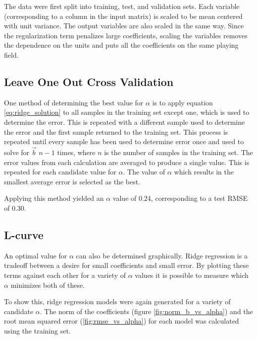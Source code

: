 \documentclass{IEEEtran}
\begin{document}
The data were first split into training, test, and validation sets. Each variable (corresponding to a 
column in the input matrix) is scaled to be mean centered with unit variance. The output variables are 
also scaled in the same way. Since the regularization term penalizes large coefficients, scaling the 
variables removes the dependence on the units and puts all the coefficients on the same playing field.

\subsection{Leave One Out Cross Validation}
One method of determining the best value for $\alpha$ is to apply equation \ref{eq:ridge_solution} to 
all samples in the training set except one, which is used to determine the error. This is repeated with a 
different sample used to determine the error and the first sample returned to the training set. This process
is repeated until every sample has been used to determine error once and used to solve for $\vec{b}$ $n-1$ 
times, where $n$ is the number of samples in the training set. The error values from each calculation are 
averaged to produce a single value. This is repeated for each candidate value for $\alpha$. The value of
$\alpha$ which results in the smallest average error is selected as the best.

Applying this method yielded an $\alpha$ value of \num{0.24}, corresponding to a test RMSE of \num{0.30}.

\subsection{L-curve} \label{ss:L-curve}
An optimal value for $\alpha$ can also be determined graphically. Ridge regression is a tradeoff 
between a desire for small coefficients and small error. By plotting these terms against each other 
for a variety of $\alpha$ values it is possible to measure which $\alpha$ minimizes both of these. 

To show this, ridge regression models were again generated for a variety of candidate $\alpha$. The norm of 
the coefficients (figure \ref{fig:norm_b_vs_alpha}) and the root mean squared error (\ref{fig:rmse_vs_alpha}) 
for each model was calculated using the training set. 
\end{document}
